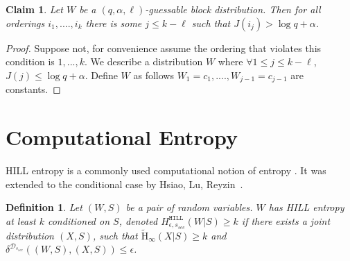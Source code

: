 \documentclass[11pt]{article}
\newcommand{\hill}{\ensuremath{\mathtt{HILL}}\xspace}
\newcommand{\Hav}{\tilde{\mathrm{H}}_\infty}
\newtheorem{definition}[theorem]{Definition}
\newtheorem{claim}[theorem]{Claim}
\begin{document}
\begin{claim}
Let $W$ be a $(q, \alpha, \ell)$-guessable block distribution.  Then for all orderings $i_1, ...., i_k$ there is some $j\leq k-\ell$ such that $J(i_j)> \log q + \alpha$.
\end{claim}
\begin{proof}
Suppose not, for convenience assume the ordering that violates this condition is $1,..., k$.  We describe a distribution $W$ where $\forall 1\leq j\leq k-\ell$, $J(j)\leq \log q +\alpha$. Define $W$ as follows $W_1 = c_1,...., W_{j-1} = c_{j-1}$ are constants.
\end{proof}



\appendix
\section{Computational Entropy}
HILL entropy is a commonly used computational notion of entropy \cite{DBLP:journals/siamcomp/HastadILL99}.  It was extended to the conditional case by Hsiao, Lu, Reyzin~\cite{DBLP:conf/eurocrypt/HsiaoLR07}. 

\begin{definition}
\label{def:hill ent}
Let $(W, S)$ be a pair of random variables.  $W$ has 
\emph{HILL entropy} at least $k$ conditioned on $S$,
denoted $H^{\hill}_{\epsilon, s_{sec}}(W|S)\geq k$ if there exists a joint distribution $(X, S)$, such that $\Hav(X|S)\geq k$ and $\delta^{\mathcal{D}_{s_{sec}}} ((W, S),(X,S))\leq \epsilon$.
\end{definition}
\end{document}
